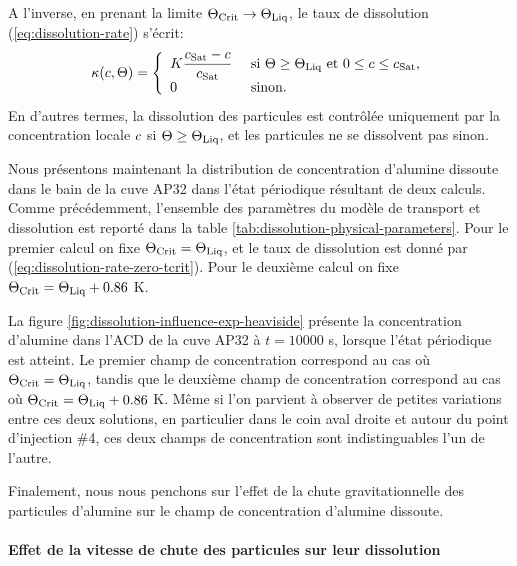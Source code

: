 A l'inverse, en prenant la limite $\Theta_\text{Crit} \to  \Theta_\text{Liq}$, le taux de
dissolution (\ref{eq:dissolution-rate}) s'écrit:
\begin{equation}\label{eq:dissolution-rate-zero-tcrit}
  \kappa(c,\Theta) = \left\{
  \begin{array}{ll}
  K \displaystyle\frac{c_\text{Sat} - c}{c_\text{Sat}}& \text{ si } \Theta
  \geq \Theta_\text{Liq}\text{ et } 0\leq c \leq c_\text{Sat},\\
  0 &  \text{ sinon.}
  \end{array}
  \right.
\end{equation}
En d'autres termes, la dissolution des particules est contrôlée
uniquement par la concentration locale $c$ si
$\Theta \geq \Theta_\text{Liq}$, et les particules ne se dissolvent pas sinon.

Nous présentons maintenant la distribution de concentration d'alumine
dissoute dans le bain de la cuve AP32 dans l'état périodique résultant
de deux calculs. Comme précédemment, l'ensemble des paramètres du
modèle de transport et dissolution est reporté dans la table
\ref{tab:dissolution-physical-parameters}. Pour le premier calcul on
fixe $\Theta_\text{Crit} = \Theta_\text{Liq}$, et le taux de dissolution est donné par
(\ref{eq:dissolution-rate-zero-tcrit}). Pour le deuxième calcul on
fixe $\Theta_\text{Crit} = \Theta_\text{Liq} + 0.86$ \si{\kelvin}.

La figure \ref{fig:dissolution-influence-exp-heaviside} présente la
concentration d'alumine dans l'ACD de la cuve AP32 à $t = \num{10000}$
\si{\second}, lorsque l'état périodique est atteint. Le premier champ
de concentration correspond au cas où $\Theta_\text{Crit} = \Theta_\text{Liq}$, tandis que le
deuxième champ de concentration correspond au cas où $\Theta_\text{Crit} = \Theta_\text{Liq} +
0.86$ \si{\kelvin}. Même si l'on parvient à observer de petites
variations entre ces deux solutions, en particulier dans le coin aval
droite et autour du point d'injection \#4, ces deux champs de
concentration sont indistinguables l'un de l'autre.

Finalement, nous nous penchons sur l'effet de la chute
gravitationnelle des particules d'alumine sur le champ de
concentration d'alumine dissoute.

\paragraph{Effet de la vitesse de chute des particules sur leur
  dissolution}



